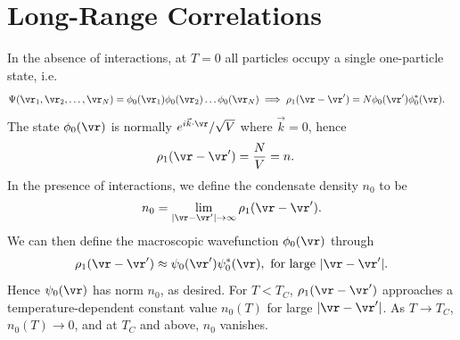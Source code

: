 \documentclass[qo.tex]{subfiles}
\begin{document}
\section{Long-Range Correlations}
In the absence of interactions, at $T=0$ all particles occupy a single one-particle state, i.e.
\begin{align}
    \Psi(\vr_1,\vr_2,\dots,\vr_N) &= \phi_0(\vr_1)\phi_0(\vr_2)\dots\phi_0(\vr_N) \implies \rho_1(\vr-\vr') = N\phi_0(\vr')\phi_0^*(\vr).
\end{align}
The state $\phi_0(\vr)$ is normally $e^{i\vec{k}\cdot\vr}/\sqrt{V}$ where $\vec{k}=0$, hence
\begin{align}
    \rho_1(\vr-\vr') &= \frac{N}{V} = n.
\end{align}
In the presence of interactions, we define the condensate density $n_0$ to be
\begin{align}
    n_0 = \lim_{|\vr-\vr'|\to\infty} \rho_1(\vr-\vr').
\end{align}
We can then define the macroscopic wavefunction $\phi_0(\vr)$ through 
\begin{align}
    \rho_1(\vr-\vr') \approx \psi_0(\vr')\psi_0^*(\vr), \text{ for large } |\vr-\vr'|.
\end{align}
Hence $\psi_0(\vr)$ has norm $n_0$, as desired.
For $T<T_C$, $\rho_1(\vr-\vr')$ approaches a temperature-dependent constant value $n_0(T)$ for large $|\vr-\vr'|$.
As $T\to T_C$, $n_0(T)\to0$, and at $T_C$ and above, $n_0$ vanishes.
\end{document}
